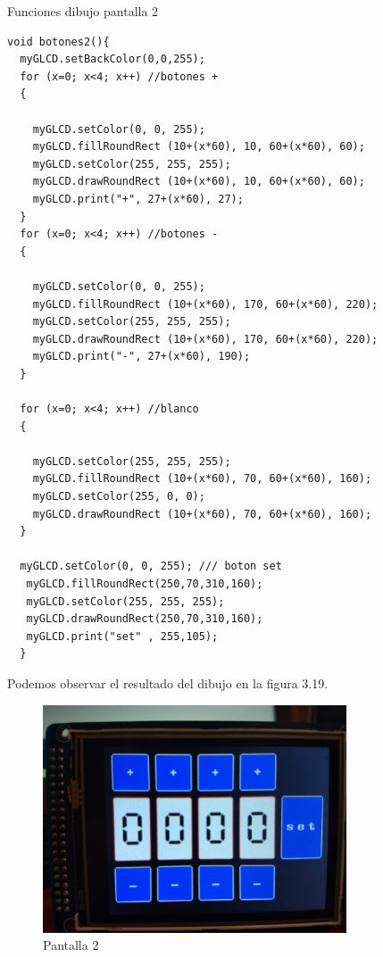Funciones dibujo pantalla 2

\begin{verbatim}
void botones2(){
  myGLCD.setBackColor(0,0,255);
  for (x=0; x<4; x++) //botones +
  {
  
    myGLCD.setColor(0, 0, 255);
    myGLCD.fillRoundRect (10+(x*60), 10, 60+(x*60), 60);
    myGLCD.setColor(255, 255, 255);
    myGLCD.drawRoundRect (10+(x*60), 10, 60+(x*60), 60);
    myGLCD.print("+", 27+(x*60), 27);
  }
  for (x=0; x<4; x++) //botones -
  {
  
    myGLCD.setColor(0, 0, 255);
    myGLCD.fillRoundRect (10+(x*60), 170, 60+(x*60), 220);
    myGLCD.setColor(255, 255, 255);
    myGLCD.drawRoundRect (10+(x*60), 170, 60+(x*60), 220);
    myGLCD.print("-", 27+(x*60), 190);
  }

  for (x=0; x<4; x++) //blanco 
  {
  
    myGLCD.setColor(255, 255, 255);
    myGLCD.fillRoundRect (10+(x*60), 70, 60+(x*60), 160);
    myGLCD.setColor(255, 0, 0);
    myGLCD.drawRoundRect (10+(x*60), 70, 60+(x*60), 160);
  }

  myGLCD.setColor(0, 0, 255); /// boton set
   myGLCD.fillRoundRect(250,70,310,160);
   myGLCD.setColor(255, 255, 255);
   myGLCD.drawRoundRect(250,70,310,160);
   myGLCD.print("set" , 255,105);
  }
\end{verbatim}

Podemos observar el resultado del dibujo en la figura 3.19.

\begin{figure}[H]
\centering
\includegraphics[width=9cm]{Capitulo3/figs/pantalla2.jpg}
\caption{Pantalla 2}
\end{figure}

